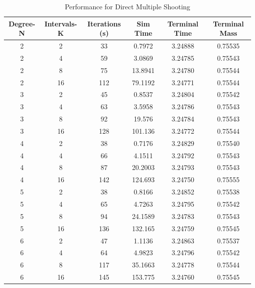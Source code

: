 \documentclass[]{article}
\begin{document}
\begin{table}
	\centering
	\begin{tabular}{||c c c c c c||} 
		\hline
		Degree-N & Intervals-K & Iterations (s) & Sim Time & Terminal Time & Terminal Mass\\ [0.5ex] 
		\hline\hline
		2        & 2           & 33             & 0.7972   & 3.24888     & 0.75535\\ 
		\hline
		2        & 4           & 59             & 3.0869   & 3.24785      & 0.75543\\
		\hline
		2        & 8           & 75             & 13.8941  & 3.24780     & 0.75544\\
		\hline
		2        & 16          & 112            & 79.1192  & 3.24771     & 0.75544\\
		\hline
		3        & 2           & 45             & 0.8537   & 3.24804     & 0.75542\\
		\hline
		3        & 4           & 63             & 3.5958   & 3.24786     & 0.75543\\
		\hline
		3        & 8           & 92             & 19.576   & 3.24784     & 0.75543\\
		\hline
		3        & 16          & 128            & 101.136  & 3.24772     & 0.75544\\
		\hline
		4        & 2           & 38             & 0.7176   & 3.24829     & 0.75540\\
		\hline
		4        & 4           & 66             & 4.1511   & 3.24792     & 0.75543\\
		\hline
		4        & 8           & 87             & 20.2003  & 3.24793     & 0.75543\\
		\hline
		4        & 16          & 142            & 124.693  & 3.24750     & 0.75555\\
		\hline
		5        & 2           & 38             & 0.8166   & 3.24852     & 0.75538\\
		\hline
		5        & 4           & 65             & 4.7263   & 3.24795     & 0.75542\\
		\hline
		5        & 8           & 94             & 24.1589  & 3.24783     & 0.75543\\
		\hline
		5        & 16          & 136            & 132.165  & 3.24759     & 0.75545\\
		\hline
		6        & 2           & 47             & 1.1136   & 3.24863     & 0.75537\\
		\hline
		6        & 4           & 64             & 4.9823   & 3.24796     & 0.75542\\
		\hline
		6        & 8           & 117            & 35.1663  & 3.24778     & 0.75544\\
		\hline
		6        & 16          & 145            & 153.775  & 3.24760     & 0.75545\\ [1ex]
		\hline
	\end{tabular}
	\caption{Performance for Direct Multiple Shooting}
	\label{table:4}
\end{table}
\end{document}
